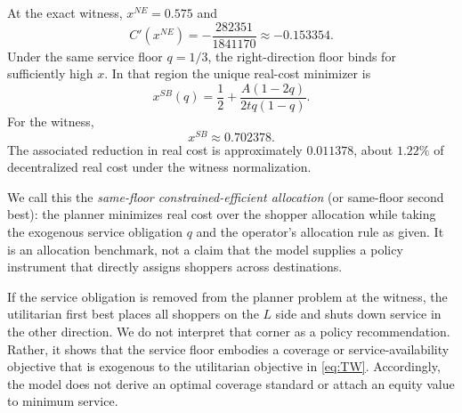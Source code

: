 At the exact witness, $x^{NE}=0.575$ and
\begin{equation}
C'(x^{NE})=-\frac{282351}{1841170}\approx-0.153354.
\end{equation}
Under the same service floor $q=1/3$, the right-direction floor binds for sufficiently high $x$. In that region the unique real-cost minimizer is
\begin{equation}
x^{SB}(q)=\frac12+\frac{A(1-2q)}{2tq(1-q)}.
\label{eq:second_best_general}
\end{equation}
For the witness,
\begin{equation}
x^{SB}\approx0.702378.
\end{equation}
The associated reduction in real cost is approximately $0.011378$, about $1.22\%$ of decentralized real cost under the witness normalization.



We call this the \emph{same-floor constrained-efficient allocation} (or same-floor second best): the planner minimizes real cost over the shopper allocation while taking the exogenous service obligation $q$ and the operator's allocation rule as given. It is an allocation benchmark, not a claim that the model supplies a policy instrument that directly assigns shoppers across destinations.

If the service obligation is removed from the planner problem at the witness, the utilitarian first best places all shoppers on the $L$ side and shuts down service in the other direction. We do not interpret that corner as a policy recommendation. Rather, it shows that the service floor embodies a coverage or service-availability objective that is exogenous to the utilitarian objective in \eqref{eq:TW}. Accordingly, the model does not derive an optimal coverage standard or attach an equity value to minimum service.
